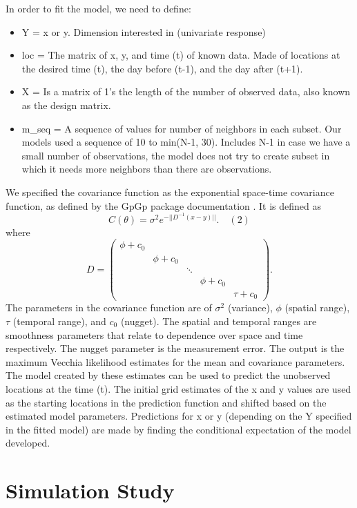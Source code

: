 \documentclass[12pt]{article}
\providecommand{\tightlist}{%
  \setlength{\itemsep}{0pt}\setlength{\parskip}{0pt}}
\begin{document}
In order to fit the model, we need to define:

\begin{itemize}
\tightlist
\item
  Y = x or y. Dimension interested in (univariate response)
\item
  loc = The matrix of x, y, and time (t) of known data. Made of
  locations at the desired time (t), the day before (t-1), and the day
  after (t+1).
\item
  X = Is a matrix of 1's the length of the number of observed data, also
  known as the design matrix.
\item
  m\_seq = A sequence of values for number of neighbors in each subset.
  Our models used a sequence of 10 to min(N-1, 30). Includes N-1 in case
  we have a small number of observations, the model does not try to
  create subset in which it needs more neighbors than there are
  observations.
\end{itemize}

We specified the covariance function as the exponential space-time
covariance function, as defined by the GpGp package documentation
\citep{gpgp_pkg}. It is defined as
\[C(\theta) = \sigma^2e^{-||D^{-1}(x-y)||}. \quad (2)\] where
\[D = \left(\begin{array}{ccccc} 
\phi + c_0 & \\
 & \phi + c_0\\
 &  & \ddots\\
 &  &  & \phi + c_0 \\
 &  &  &  &  \tau+c_0
\end{array}\right). \] The parameters in the covariance function are of
\(\sigma^2\) (variance), \(\phi\) (spatial range), \(\tau\) (temporal
range), and \(c_0\) (nugget). The spatial and temporal ranges are
smoothness parameters that relate to dependence over space and time
respectively. The nugget parameter is the measurement error. The output
is the maximum Vecchia likelihood estimates for the mean and covariance
parameters. The model created by these estimates can be used to predict
the unobserved locations at the time (t). The initial grid estimates of
the x and y values are used as the starting locations in the prediction
function and shifted based on the estimated model parameters.
Predictions for x or y (depending on the Y specified in the fitted
model) are made by finding the conditional expectation of the model
developed.

\hypertarget{simulation}{%
\section{Simulation Study}\label{simulation}}
\end{document}
